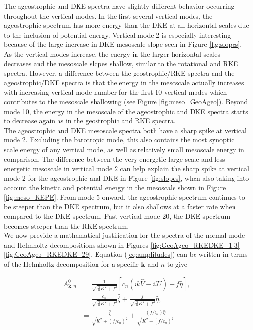 The ageostrophic and DKE spectra have slightly different behavior occurring throughout the vertical modes. In the first several vertical modes, the ageostrophic spectrum has more energy than the DKE at all horizontal scales due to the inclusion of potential energy. Vertical mode 2 is especially interesting because of the large increase in DKE mesoscale slope seen in Figure \ref{fig:slopes}.  As the vertical modes increase, the energy in the larger horizontal scales decreases and the mesoscale slopes shallow, similar to the rotational and RKE spectra. However, a difference between the geostrophic/RKE spectra and the ageostrophic/DKE spectra is that the energy in the mesoscale actually increases with increasing vertical mode number for the first 10 vertical modes which contributes to the mesoscale shallowing (see Figure \ref{fig:meso_GeoAgeo}). Beyond mode 10, the energy in the mesoscale of the ageostrophic and DKE spectra starts to decrease again as in the geostrophic and RKE spectra.\\

The ageostrophic and DKE mesoscale spectra both have a sharp spike at vertical mode 2. Excluding the barotropic mode, this also contains the most synoptic scale energy of any vertical mode, as well as relatively small mesoscale energy in comparison. The difference between the very energetic large scale and less energetic mesoscale in vertical mode 2 can help explain the sharp spike at vertical mode 2 for the ageostrophic and DKE in Figure \ref{fig:slopes}, when also taking into account the kinetic and potential energy in the mesoscale shown in Figure \ref{fig:meso_KEPE}. From mode 5 onward, the ageostrophic spectrum continues to be steeper than the DKE spectrum, but it also shallows at a faster rate when compared to the DKE spectrum. Past vertical mode 20, the DKE spectrum becomes steeper than the RKE spectrum.\\

We now provide a mathematical justification for the spectra of the normal mode and Helmholtz decompositions shown in Figures \ref{fig:GeoAgeo_RKEDKE_1-3} - \ref{fig:GeoAgeo_RKEDKE_29}. Equation (\ref{eq:amplitudes}) can be written in terms of the Helmholtz decomposition for a specific $\mathbf{k}$ and $n$ to give

\begin{align}
A^0_{\mathbf{k},n} &= \frac{1}{\sqrt{c^2_n K^2 + f^2}} \left[ c_n (ik\widehat{V} - il\widehat{U}) + f \widehat{\eta} \right],\\
&= \frac{c_n}{\sqrt{c^2_n K^2 + f^2}}\widehat{\zeta} + \frac{f}{\sqrt{c^2_n K^2 + f^2}} \widehat{\eta},\\
&= \frac{\widehat{\zeta}}{\sqrt{K^2 + (f/c_n)^2}} + \frac{(f/c_n) \widehat{\eta}}{\sqrt{K^2 + (f/c_n)^2}}.
\end{align}


